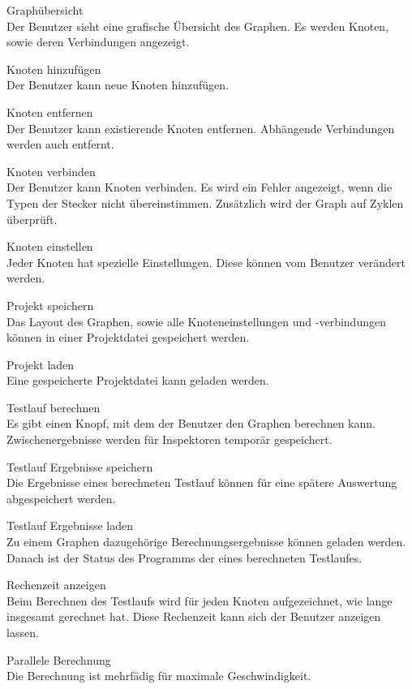 \begin{speclist}[F]
\setcounter{specnum}{51010}

\spec Graphübersicht \\
Der Benutzer sieht eine grafische Übersicht des Graphen. Es werden Knoten, sowie deren Verbindungen angezeigt.

\spec Knoten hinzufügen \\
Der Benutzer kann neue Knoten hinzufügen.

\spec Knoten entfernen \\
Der Benutzer kann existierende Knoten entfernen. Abhängende Verbindungen werden auch entfernt.

\spec Knoten verbinden \\
Der Benutzer kann Knoten verbinden. Es wird ein Fehler angezeigt, wenn die Typen der Stecker nicht übereinstimmen. Zusätzlich wird der Graph auf Zyklen überprüft.

\spec Knoten einstellen \\
Jeder Knoten hat spezielle Einstellungen. Diese können vom Benutzer verändert werden.

\spec Projekt speichern \\
Das Layout des Graphen, sowie alle Knoteneinstellungen und -verbindungen können in einer Projektdatei gespeichert werden.

\spec Projekt laden \\
Eine gespeicherte Projektdatei kann geladen werden.

\spec Testlauf berechnen \\
Es gibt einen Knopf, mit dem der Benutzer den Graphen berechnen kann. Zwischenergebnisse werden für Inspektoren temporär gespeichert.

\spec Testlauf Ergebnisse speichern \\
Die Ergebnisse eines berechneten Testlauf können für eine spätere Auswertung abgespeichert werden.

\spec Testlauf Ergebnisse laden \\
Zu einem Graphen dazugehörige Berechnungsergebnisse können geladen werden. Danach ist der Status des Programms der eines berechneten Testlaufes.

\spec Rechenzeit anzeigen \\
Beim Berechnen des Testlaufs wird für jeden Knoten aufgezeichnet, wie lange insgesamt gerechnet hat. Diese Rechenzeit kann sich der Benutzer anzeigen lassen.

\optspec Parallele Berechnung \\
Die Berechnung ist mehrfädig für maximale Geschwindigkeit.

\end{speclist}
